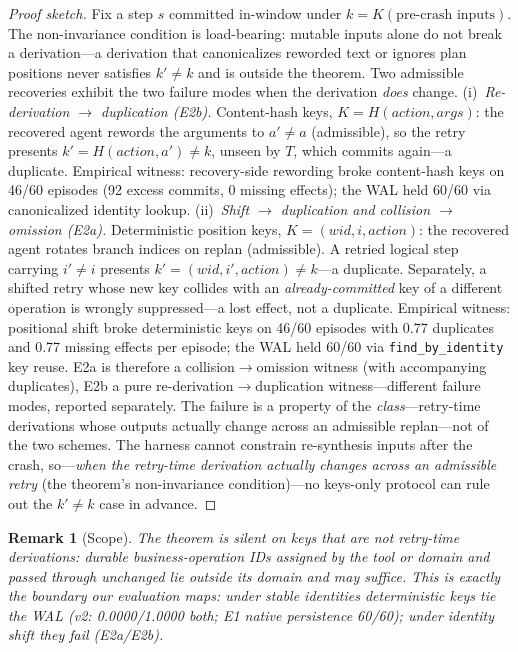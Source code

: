 \documentclass[10pt,journal,compsoc]{IEEEtran}
\newtheorem{remark}{Remark}
\begin{document}
\begin{proof}[Proof sketch]
Fix a step $s$ committed in-window under $k = K(\text{pre-crash
inputs})$. The non-invariance condition is load-bearing: mutable
inputs alone do not break a derivation---a derivation that
canonicalizes reworded text or ignores plan positions never
satisfies $k' \ne k$ and is outside the theorem. Two admissible
recoveries exhibit the two failure modes when the derivation
\emph{does} change.
(i)~\emph{Re-derivation $\to$ duplication (E2b).} Content-hash
keys, $K = H(\mathit{action}, \mathit{args})$: the recovered
agent rewords the arguments to $a' \ne a$ (admissible), so the
retry presents $k' = H(\mathit{action}, a') \ne k$, unseen by
$T$, which commits again---a duplicate. Empirical witness:
recovery-side rewording broke content-hash keys on 46/60
episodes (92 excess commits, 0 missing effects); the WAL held
60/60 via canonicalized identity lookup.
(ii)~\emph{Shift $\to$ duplication and collision $\to$ omission
(E2a).} Deterministic position keys, $K = (\mathit{wid}, i,
\mathit{action})$: the recovered agent rotates branch indices
on replan (admissible). A retried logical step carrying
$i' \ne i$ presents $k' = (\mathit{wid}, i', \mathit{action})
\ne k$---a duplicate. Separately, a shifted retry whose new key
collides with an \emph{already-committed} key of a different
operation is wrongly suppressed---a lost effect, not a
duplicate. Empirical witness: positional shift broke
deterministic keys on 46/60 episodes with 0.77 duplicates and
0.77 missing effects per episode; the WAL held 60/60 via
\texttt{find\_by\_identity} key reuse. E2a is therefore a
collision$\to$omission witness (with accompanying duplicates),
E2b a pure re-derivation$\to$duplication witness---different
failure modes, reported separately.
The failure is a property of the \emph{class}---retry-time
derivations whose outputs actually change across an admissible
replan---not of the two schemes. The harness cannot constrain
re-synthesis inputs after the crash, so---\emph{when the
retry-time derivation actually changes across an admissible
retry} (the theorem's non-invariance condition)---no keys-only
protocol can rule out the $k' \ne k$ case in advance.
\end{proof}

\begin{remark}[Scope]
The theorem is silent on keys that are \emph{not} retry-time
derivations: durable business-operation IDs assigned by the tool
or domain and passed through unchanged lie outside its domain
and may suffice. This is exactly the boundary our evaluation
maps: under stable identities deterministic keys tie the WAL
(v2: 0.0000/1.0000 both; E1 native persistence 60/60); under
identity shift they fail (E2a/E2b).
\end{remark}
\end{document}
